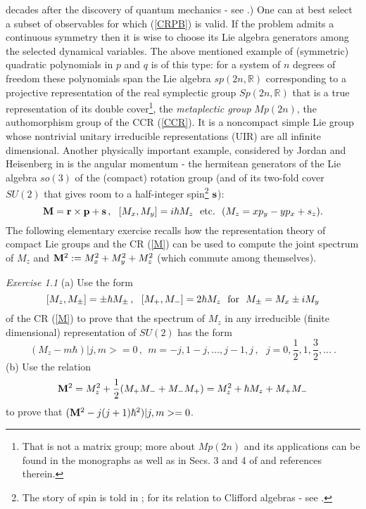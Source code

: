 decades after the discovery of quantum mechanics - see \cite{G46, V51}.)
 One can at best select a subset of observables for which (\ref{CRPB}) is valid.
 If the problem admits a continuous symmetry then it is wise to choose its Lie
algebra generators among the selected dynamical variables. The above mentioned
example of (symmetric) quadratic polynomials in $p$ and $q$ is of this type:
for a system of $n$ degrees of freedom these polynomials span the Lie algebra
$sp(2n, \mathbb{R})$ corresponding to a projective representation of the real
symplectic group $Sp(2n, \mathbb{R})$ that is a true representation of its
double cover\footnote{That is not a matrix group; more about $Mp(2n)$ and its applications 
can be found in the monographs \cite{F, deG} as well as in Secs. 3 and 4 of 
\cite{T10} and references therein.}, the {\it metaplectic
group} $Mp(2n)$, the authomorphism group of the CCR (\ref{CCR}). It is a
noncompact simple Lie group whose nontrivial unitary irreducible representations
(UIR) are all infinite dimensional. Another physically important example,
considered by Jordan and Heisenberg in \cite{BHJ} is the angular momentum -
the hermitean generators of the Lie algebra $so(3)$ of the (compact) rotation
group (and of its two-fold cover $SU(2)$ that gives room to a half-integer spin\footnote{The story of spin 
is told in \cite{Tom}; for its relation to Clifford algebras - see \cite{T11}.} ${\bf s}$):
\begin{equation}
\label{M}
{\bf M} = {\bf r}\times {\bf p} + {\bf s} \,, \  \ [M_x, M_y] = i\hbar M_z \ \ {\rm etc.} \ \ (M_z = xp_y - yp_x +s_z).
\end{equation}
The following elementary exercise recalls how the representation theory of compact Lie groups
and the CR (\ref{M}) can be used to compute the joint spectrum of $M_z$ and ${\bf M}^2 :=
M_x^2 + M_y^2 + M_z^2$ (which commute among themselves).

{\it Exercise 1.1} (a) Use the form
\begin{equation}
\label{Mpm}
[M_z, M_{\pm}] = \pm \hbar M_{\pm}\,, \ \ [M_+, M_-] = 2\hbar M_z \ \ {\rm for} \ \ M_\pm = M_x \pm i M_y
\end{equation}
of the CR (\ref{M}) to prove that the spectrum of $M_z$ in any irreducible (finite dimensional) representation of
$SU(2)$ has the form
\begin{equation}
\label{Mz}
(M_z - m\hbar) |j, m> = 0\,, \ \ m = -j, 1-j, \dots ,j-1, j\,,\ \ \ j = 0, \frac{1}{2}, 1, \frac{3}{2}, \dots \ .
\end{equation}
(b) Use the relation
\begin{equation}
\label{M2}
{\bf M}^2 = M_z^2 +\frac{1}{2}(M_+ M_- + M_- M_+) = M_z^2 + \hbar M_z + M_+M_-
\end{equation}
to prove that $({\bf M}^2 - j(j+1)\hbar^2)|j, m> = 0$. 

